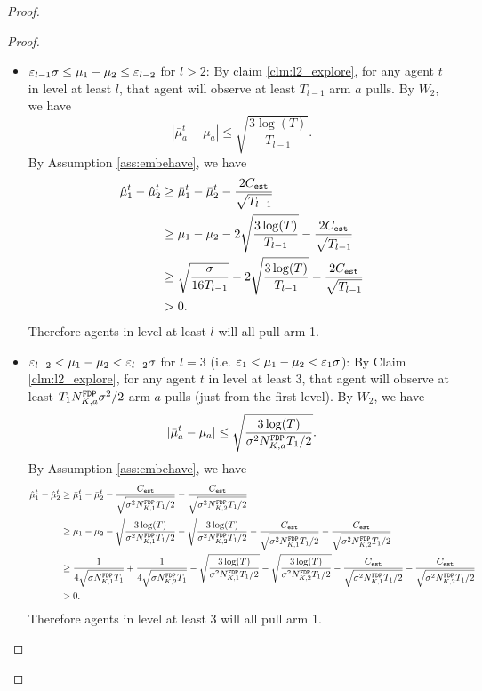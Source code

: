 \begin{proof}
\begin{proof}
\begin{itemize}
\item $\varepsilon_{l-1} \NG \leq \mu_1 - \mu_2 \leq \varepsilon_{l-2}$ for $l > 2$: By claim \ref{clm:l2_explore}, for any agent $t$ in level at least $l$, that agent will observe at least $T_{l-1}$ arm $a$ pulls. By $W_2$, we have
\[
|\bar{\mu}_a^t - \mu_a| \leq \sqrt{\frac{3\log(T)}{T_{l-1}}}.
\]
By Assumption \ref{ass:embehave}, we have
\begin{align*}
\hat{\mu}_1^t - \hat{\mu}_2^t &\geq \bar{\mu}_1^t - \bar{\mu}_2^t - \frac{2\estC}{\sqrt{T_{l-1}}} \\
&\geq \mu_1 -\mu_2 - 2 \sqrt{\frac{3\log(T)}{T_{l-1}}}- \frac{2\estC}{\sqrt{T_{l-1}}} \\
&\geq\sqrt{\frac{\NG}{16T_{l-1}}} -  2 \sqrt{\frac{3\log(T)}{T_{l-1}}}- \frac{2\estC}{\sqrt{T_{l-1}}} \\
&>0.
\end{align*}
Therefore agents in level at least $l$ will all pull arm 1.

\item $\varepsilon_{l-2} < \mu_1 - \mu_2 < \varepsilon_{l-2}\NG$ for $l =3$ (i.e. $\varepsilon_1 < \mu_1 - \mu_2 < \varepsilon_1\NG$): By Claim \ref{clm:l2_explore}, for any agent $t$ in level at least $3$, that agent will observe at least $T_1\fdpN \NG^2/2$ arm $a$ pulls (just from the first level). By $W_2$, we have
\[
|\bar{\mu}_a^t - \mu_a| \leq \sqrt{\frac{3\log(T)}{\NG^2\fdpN T_1/2}}.
\]
By Assumption \ref{ass:embehave}, we have
\begin{align*}
\hat{\mu}_1^t - \hat{\mu}_2^t &\geq \bar{\mu}_1^t - \bar{\mu}_2^t - \frac{\estC}{\sqrt{\NG^2\fdpN[1]T_1/2}}-\frac{\estC}{\sqrt{\NG^2\fdpN[2]T_1/2}}  \\
&\geq \mu_1 -\mu_2 -  \sqrt{\frac{3\log(T)}{\NG^2\fdpN[1]T_1/2}}- \sqrt{\frac{3\log(T)}{\NG^2\fdpN[2]T_1/2}}- \frac{\estC}{\sqrt{\NG^2\fdpN[1]T_1/2}}-\frac{\estC}{\sqrt{\NG^2\fdpN[2]T_1/2}}  \\
&\geq\frac{1}{4\sqrt{\NG\fdpN[1]T_1}} + \frac{1}{4\sqrt{\NG\fdpN[2]T_1}}  -  \sqrt{\frac{3\log(T)}{\NG^2\fdpN[1]T_1/2}}- \sqrt{\frac{3\log(T)}{\NG^2\fdpN[2]T_1/2}}- \frac{\estC}{\sqrt{\NG^2\fdpN[1]T_1/2}}-\frac{\estC}{\sqrt{\NG^2\fdpN[2]T_1/2}}  \\
&>0.
\end{align*}
Therefore agents in level at least 3 will all pull arm 1.


\end{itemize}
\end{proof}
\end{proof}

